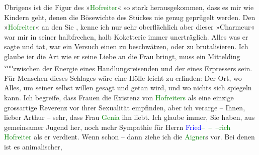            Übrigens ist die Figur des »\textcolor{green}{Hofreiter}{}« so stark herausgekommen, dass es mir wie Kindern geht, denen die
               Bösewichte des Stückes nie genug geprügelt werden. Den »\textcolor{green}{Hofreiter}{}« an den Sie \label{K_L01942-4v}\label{K_L01942-4h}, kenne ich nur sehr oberflächlich aber dieser »Charmeur« war mir in seiner
               halbfrechen, halb \label{K_L01942-3v}\label{K_L01942-3h}
               Koketterie immer unerträglich. Alles was er sagte und tat, war ein Versuch einen zu
               beschwätzen, oder zu brutalisieren. Ich glaube i{\geminationm}er die
               Art wie er seine Liebe an die Frau bringt, muss ein Mittelding \substVorne{}\textsuperscript{von}\substDazwischen{}zwischen\substHinten{} der Energie eines {\pb}Handlungsreisenden und der eines Erpressers 
               sein. Für Menschen dieses Schlages wäre eine Hölle leicht zu erfinden: Der Ort, wo
               Alles, um seiner selbst willen gesagt und getan wird, und wo nichts sich spiegeln
               kann. Ich begreife, dass Frauen die Existenz von \textcolor{green}{Hofreiters}{} als eine einzige grossartige Reverenz vor ihrer
               Sexualität empfinden, aber ich verarge – Ihnen, lieber Arthur – sehr, dass Frau \textcolor{green}{Genia}{} ihn liebt. Ich glaube immer,
                   Sie haben, aus gemeinsamer Jugend her, noch mehr
               Sympathie für Herrn \textcolor{green}{\textcolor{blue}{Fried}{}– – –rich
                  Hofreiter}{} als er verdient. Wenn schon – dann ziehe ich die \textcolor{green}{Aigner}{}s vor. Bei denen ist es animalischer,
